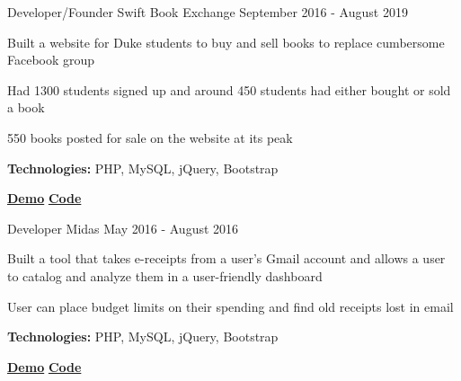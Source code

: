 
\begin{cventries}

  \cventry
    {Developer/Founder} %
    {Swift Book Exchange} %
    {} %
    {September 2016 - August 2019} %
    {
      \begin{cvitems} %
      	\item {Built a website for Duke students to buy and sell books to replace cumbersome Facebook group}
		\item {Had 1300 students signed up and around 450 students had either bought or sold a book}
		\item {550 books posted for sale on the website at its peak}
		{\setlength \itemindent{-2ex} \itemsep2pt \item[] \textbf{Technologies:} PHP, MySQL, jQuery, Bootstrap}
		{\setlength \itemindent{-2ex} \itemsep2pt \item[]  \href{https://sujaygarlanka.com/projects.html\#swift}{ \faPlayCircle \textbf{ Demo}} \href{https://github.com/sujaygarlanka/swift-book-exchange}{ \faGithub \textbf{ Code}}}
      \end{cvitems}
    }
    
  \cventry
    {Developer} %
    {Midas} %
    {} %
    {May 2016 - August 2016} %
    {
      \begin{cvitems} %
		\item {Built a tool that takes e-receipts from a user’s Gmail account and allows a user to catalog and
analyze them in a user-friendly dashboard}
        \item {User can place budget limits on their spending and find old receipts lost in email}
        {\setlength \itemindent{-2ex} \itemsep2pt \item[] \textbf{Technologies:} PHP, MySQL, jQuery, Bootstrap}
        {\setlength \itemindent{-2ex} \itemsep2pt \item[]  \href{https://sujaygarlanka.com/projects.html\#receipt}{ \faPlayCircle \textbf{ Demo}} \href{https://github.com/sujaygarlanka/receipt-database}{ \faGithub \textbf{ Code}}}
      \end{cvitems}
    }
\end{cventries}